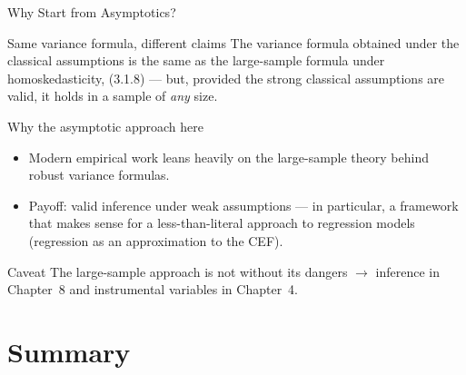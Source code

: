 \documentclass[aspectratio=169,11pt]{beamer}
\begin{document}
\begin{frame}{Why Start from Asymptotics?}
\small

\begin{block}{Same variance formula, different claims}
The variance formula obtained under the classical assumptions is the same as
the large-sample formula under homoskedasticity, (3.1.8) --- but, provided
the strong classical assumptions are valid, it holds in a sample of
\emph{any} size.
\end{block}

\medskip

\begin{block}{Why the asymptotic approach here}
\begin{itemize}
    \item Modern empirical work leans heavily on the large-sample theory
    behind robust variance formulas.
    \item Payoff: valid inference under weak assumptions --- in particular,
    a framework that makes sense for a less-than-literal approach to
    regression models (regression as an approximation to the CEF).
\end{itemize}
\end{block}

\medskip

\begin{alertblock}{Caveat}
The large-sample approach is not without its dangers $\rightarrow$
inference in Chapter~8 and instrumental variables in Chapter~4.
\end{alertblock}

\end{frame}



\section{Summary}
\end{document}
